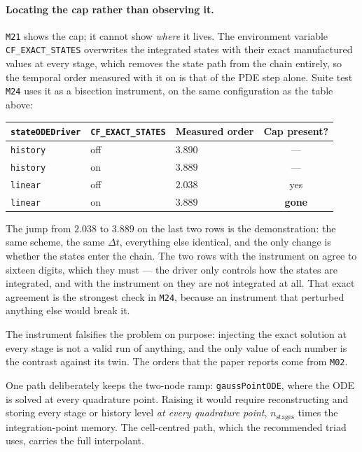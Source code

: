 \documentclass[11pt,a4paper]{article}
\newcommand{\code}[1]{\texttt{\small #1}}
\begin{document}
\paragraph{Locating the cap rather than observing it.}
\code{M21} shows the cap; it cannot show \emph{where} it lives. The environment
variable \code{CF\_EXACT\_STATES} overwrites the integrated states with their
exact manufactured values at every stage, which removes the state path from the
chain entirely, so the temporal order measured with it on is that of the PDE step
alone. Suite test \code{M24} uses it as a bisection instrument, on the same
configuration as the table above:
\begin{center}
\begin{tabular}{@{}lllc@{}}
\toprule
\code{stateODEDriver} & \code{CF\_EXACT\_STATES} & Measured order & Cap present? \\
\midrule
\code{history} & off & $3.890$ & --- \\
\code{history} & on  & $3.889$ & --- \\
\code{linear}  & off & $2.038$ & yes \\
\code{linear}  & on  & $\mathbf{3.889}$ & \textbf{gone} \\
\bottomrule
\end{tabular}
\end{center}
The jump from $2.038$ to $3.889$ on the last two rows is the demonstration: the
same scheme, the same $\Delta t$, everything else identical, and the only change
is whether the states enter the chain. The two rows with the instrument on agree
to sixteen digits, which they must --- the driver only controls how the states are
integrated, and with the instrument on they are not integrated at all. That exact
agreement is the strongest check in \code{M24}, because an instrument that
perturbed anything else would break it.

The instrument falsifies the problem on purpose: injecting the exact solution at
every stage is not a valid run of anything, and the only value of each number is
the contrast against its twin. The orders that the paper reports come from
\code{M02}.

One path deliberately keeps the two-node ramp: \code{gaussPointODE}, where the
ODE is solved at every quadrature point. Raising it would require reconstructing
and storing every stage or history level \emph{at every quadrature point},
$n_{\text{stages}}$ times the integration-point memory. The cell-centred path,
which the recommended triad uses, carries the full interpolant.
\end{document}

